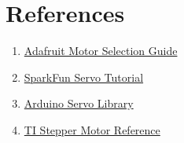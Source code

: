 \section{References}
\begin{enumerate}
	\item \href{https://learn.adafruit.com/adafruit-motor-selection-guide?view=all}{Adafruit Motor Selection Guide}
	\item \href{https://learn.sparkfun.com/tutorials/hobby-servo-tutorial/all}{SparkFun Servo Tutorial}
	\item \href{https://www.arduino.cc/reference/en/libraries/servo/}{Arduino Servo Library}
	\item \href{https://www.ti.com/lit/an/slva767a/slva767a.pdf}{TI Stepper Motor Reference}
\end{enumerate}
